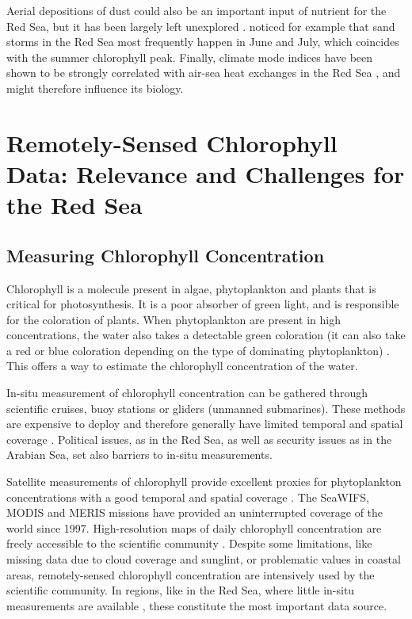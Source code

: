 Aerial depositions of dust could also be an important input of nutrient for the Red Sea, but it has been largely left unexplored \citep{Triantafyllou2014}. \citet{Raitsos2013} noticed for example that sand storms in the Red Sea most frequently happen in June and July, which coincides with the summer chlorophyll peak. Finally, climate mode indices have been shown to be strongly correlated with air-sea heat exchanges in the Red Sea \citep{Abulnaja2015}, and might therefore influence its biology.

\section{Remotely-Sensed Chlorophyll Data: Relevance and Challenges for the Red
Sea}

\subsection{Measuring Chlorophyll Concentration}

Chlorophyll is a molecule present in algae, phytoplankton and plants that is critical for photosynthesis. It is a poor absorber of green light, and is responsible for the coloration of plants. When phytoplankton are present in high concentrations, the water also takes a detectable green coloration (it can also take a red or blue coloration depending on the type of dominating phytoplankton) \citep{Robinson2010}. This offers a way to estimate the chlorophyll concentration of the water.

In-situ measurement of chlorophyll concentration can be gathered through scientific cruises, buoy stations or gliders (unmanned submarines). These methods are expensive to deploy and therefore generally have limited temporal and spatial coverage \citep{Robinson2010}. Political issues, as in the Red Sea, as well as security issues as in the Arabian Sea, set also barriers to in-situ measurements.

Satellite measurements of chlorophyll provide excellent proxies for phytoplankton concentrations with a good temporal and spatial coverage \citep{Robinson2010}. The SeaWIFS, MODIS and MERIS missions have provided an uninterrupted coverage of the world since 1997. High-resolution maps of daily chlorophyll concentration are freely accessible to the scientific community \citep{McClain2009}. Despite some limitations, like missing data due to cloud coverage and sunglint, or problematic values in coastal areas, remotely-sensed chlorophyll concentration are intensively used by the scientific community. In regions, like in the Red Sea, where little in-situ measurements are available \citep{Raitsos2013, Brewin2013}, these constitute the most important data source.

